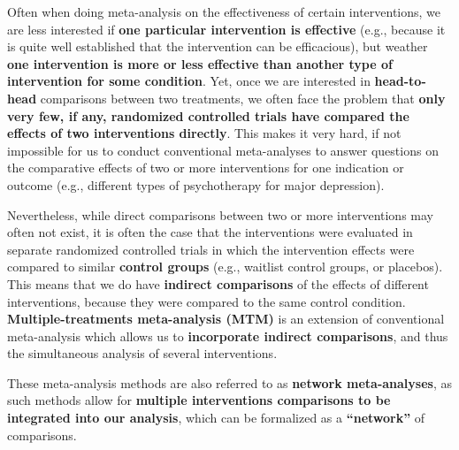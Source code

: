 \documentclass[]{book}
\theoremstyle{definition}
\theoremstyle{definition}
\theoremstyle{definition}
\theoremstyle{remark}
\begin{document}
Often when doing meta-analysis on the effectiveness of certain
interventions, we are less interested if \textbf{one particular
intervention is effective} (e.g., because it is quite well established
that the intervention can be efficacious), but weather \textbf{one
intervention is more or less effective than another type of intervention
for some condition}. Yet, once we are interested in
\textbf{head-to-head} comparisons between two treatments, we often face
the problem that \textbf{only very few, if any, randomized controlled
trials have compared the effects of two interventions directly}. This
makes it very hard, if not impossible for us to conduct conventional
meta-analyses to answer questions on the comparative effects of two or
more interventions for one indication or outcome (e.g., different types
of psychotherapy for major depression).

Nevertheless, while direct comparisons between two or more interventions
may often not exist, it is often the case that the interventions were
evaluated in separate randomized controlled trials in which the
intervention effects were compared to similar \textbf{control groups}
(e.g., waitlist control groups, or placebos). This means that we do have
\textbf{indirect comparisons} of the effects of different interventions,
because they were compared to the same control condition.
\textbf{Multiple-treatments meta-analysis (MTM)} is an extension of
conventional meta-analysis which allows us to \textbf{incorporate
indirect comparisons}, and thus the simultaneous analysis of several
interventions.

These meta-analysis methods are also referred to as \textbf{network
meta-analyses}, as such methods allow for \textbf{multiple interventions
comparisons to be integrated into our analysis}, which can be formalized
as a \textbf{``network''} of comparisons.
\end{document}
